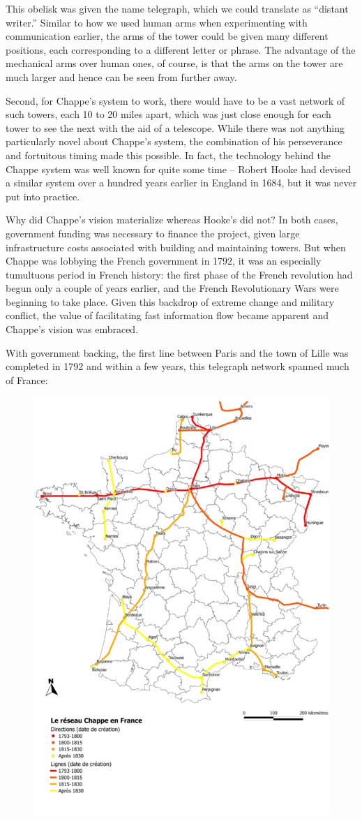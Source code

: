 \documentclass{book}
\begin{document}
This obelisk was given the name telegraph, which we could translate as ``distant writer.'' Similar to how we used human arms when experimenting with communication earlier, the arms of the tower could be given many different positions, each corresponding to a different letter or phrase. The advantage of the mechanical arms over human ones, of course, is that the arms on the tower are much larger and hence can be seen from further away.

Second, for Chappe's system to work, there would have to be a vast network of such towers, each 10 to 20 miles apart, which was just close enough for each tower to see the next with the aid of a telescope. While there was not anything particularly novel about Chappe's system, the combination of his perseverance and fortuitous timing made this possible. In fact, the technology behind the Chappe system was well known for quite some time -- Robert Hooke had devised a similar system over a hundred years earlier in England in 1684, but it was never put into practice.

Why did Chappe's vision materialize whereas Hooke's did not? In both cases, government funding was necessary to finance the project, given large infrastructure costs associated with building and maintaining towers. But when Chappe was lobbying the French government in 1792, it was an especially tumultuous period in French history: the first phase of the French revolution had begun only a couple of years earlier, and the French Revolutionary Wars were beginning to take place. Given this backdrop of extreme change and military conflict, the value of facilitating fast information flow became apparent and Chappe's vision was embraced.

With government backing, the first line between Paris and the town of Lille was completed in 1792 and within a few years, this telegraph network spanned much of France:

\begin{figure}[H]
\centering
\includegraphics[width=0.5\linewidth]{chappe_network}
\end{figure}
\end{document}
